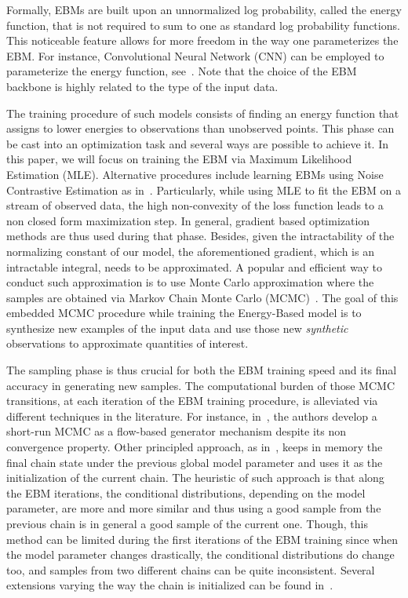 \documentclass[letterpaper]{article} %
\begin{document}
Formally, EBMs are built upon an unnormalized log probability, called the energy function, that is not required to sum to one as standard log probability functions.
This noticeable feature allows for more freedom in the way one parameterizes the EBM.
For instance, Convolutional Neural Network (CNN) can be employed to parameterize the energy function, see~\citet{xie2016theory}.
Note that the choice of the EBM backbone is highly related to the type of the input data.

The training procedure of such models consists of finding an energy function that assigns to lower energies to observations than unobserved points.
This phase can be cast into an optimization task and several ways are possible to achieve it.
In this paper, we will focus on training the EBM via Maximum Likelihood Estimation (MLE).
Alternative procedures include learning EBMs using Noise Contrastive Estimation as in~\citet{gao2020flow}.
Particularly, while using MLE to fit the EBM on a stream of observed data, the high non-convexity of the loss function leads to a non closed form maximization step. 
In general, gradient based optimization methods are thus used during that phase.
Besides, given the intractability of the normalizing constant of our model, the aforementioned gradient, which is an intractable integral, needs to be approximated.
A popular and efficient way to conduct such approximation is to use Monte Carlo approximation where the samples are obtained via Markov Chain Monte Carlo (MCMC)~\cite{meyn2012markov}.
The goal of this embedded MCMC procedure while training the Energy-Based model is to synthesize new examples of the input data and use those new \emph{synthetic} observations to approximate quantities of interest.

The sampling phase is thus crucial for both the EBM training speed and its final accuracy in generating new samples.
The computational burden of those MCMC transitions, at each iteration of the EBM training procedure, is alleviated via different techniques in the literature.
For instance, in~\citet{nijkamp2019learning}, the authors develop a short-run MCMC as a flow-based generator mechanism despite its non convergence property.
Other principled approach, as in~\citet{hinton2002training}, keeps in memory the final chain state under the previous global model parameter and uses it as the initialization of the current chain.
The heuristic of such approach is that along the EBM iterations, the conditional distributions, depending on the model parameter, are more and more similar and thus using a good sample from the previous chain is in general a good sample of the current one.
Though, this method can be limited during the first iterations of the EBM training since when the model parameter changes drastically, the conditional distributions do change too, and samples from two different chains can be quite inconsistent.
Several extensions varying the way the chain is initialized can be found in~\citet{welling2002new,gao2018learning,du2019implicit}.
\end{document}
